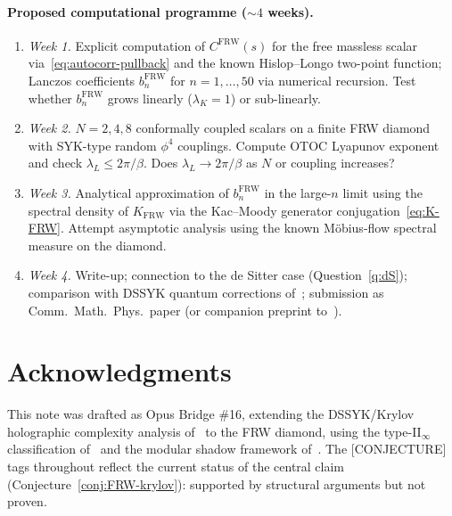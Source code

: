 \documentclass[12pt,a4paper]{article}
\theoremstyle{definition}
\newcommand{\lK}{\lambda_K}
\newcommand{\lL}{\lambda_L}
\newcommand{\FRW}{\mathrm{FRW}}
\begin{document}
\paragraph{Proposed computational programme ($\sim 4$ weeks).}
\begin{enumerate}
\item \textit{Week 1.} Explicit computation of $C^\FRW(s)$ for the
  free massless scalar via~\eqref{eq:autocorr-pullback} and the known
  Hislop--Longo two-point function; Lanczos coefficients $b_n^\FRW$
  for $n = 1, \ldots, 50$ via numerical recursion.
  Test whether $b_n^\FRW$ grows linearly ($\lK = 1$) or sub-linearly.

\item \textit{Week 2.} $N = 2, 4, 8$ conformally coupled scalars on
  a finite FRW diamond with SYK-type random $\phi^4$ couplings.
  Compute OTOC Lyapunov exponent and check $\lL \le 2\pi/\beta$.
  Does $\lL \to 2\pi/\beta$ as $N$ or coupling increases?

\item \textit{Week 3.} Analytical approximation of $b_n^\FRW$ in the
  large-$n$ limit using the spectral density of $K_\FRW$ via the
  Kac--Moody generator conjugation~\eqref{eq:K-FRW}.
  Attempt asymptotic analysis using the known M\"{o}bius-flow spectral
  measure on the diamond.

\item \textit{Week 4.} Write-up; connection to the de Sitter case
  (Question~\ref{q:dS}); comparison with DSSYK quantum corrections
  of~\cite{HPS2024}; submission as Comm.\ Math.\ Phys.\ paper
  (or companion preprint to~\cite{ModularShadow}).
\end{enumerate}

\section*{Acknowledgments}

This note was drafted as Opus Bridge \#16, extending the
DSSYK/Krylov holographic complexity analysis of~\cite{HPS2024}
to the FRW diamond, using the type-II$_\infty$ classification
of~\cite{FRWnote} and the modular shadow framework of~\cite{ECI_v6,ModularShadow}.
The [CONJECTURE] tags throughout reflect the current status of the
central claim (Conjecture~\ref{conj:FRW-krylov}): supported by structural
arguments but not proven.
\end{document}
